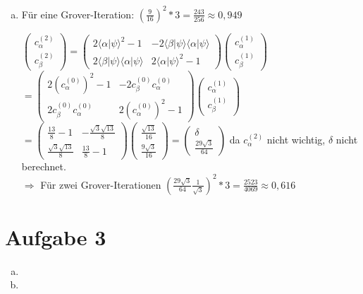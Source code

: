 \documentclass[a4paper]{scrartcl}
\begin{document}
\begin{enumerate}[a)]
\item Für eine Grover-Iteration: $(\frac{9}{16})^2*3 = \frac{243}{256} \approx 0,949$

$\begin{pmatrix} c_{\alpha}^{(2)}\\ c_{\beta}^{(2)}\end{pmatrix} = \begin{pmatrix} 2 \langle \alpha | \psi \rangle^2 -1 & -2 \langle \beta | \psi \rangle \langle \alpha | \psi \rangle \\ 2 \langle \beta | \psi \rangle \langle \alpha | \psi \rangle & 2 \langle \alpha | \psi \rangle^2 -1 \end{pmatrix} \begin{pmatrix} c_{\alpha}^{(1)}\\ c_{\beta}^{(1)}\end{pmatrix}$\\
$=\begin{pmatrix} 2 (c_{\alpha}^{(0)})^2 -1 & -2 c_{\beta}^{(0)} c_{\alpha}^{(0)} \\ 2 c_{\beta}^{(0)} c_{\alpha}^{(0)} & 2 (c_{\alpha}^{(0)})^2 -1 \end{pmatrix} \begin{pmatrix} c_{\alpha}^{(1)}\\ c_{\beta}^{(1)}\end{pmatrix}$\\
$=\begin{pmatrix} \frac{13}{8}-1 & - \frac{\sqrt{3}\sqrt{13}}{8} \\ \frac{\sqrt{3}\sqrt{13}}{8} & \frac{13}{8}-1 \end{pmatrix} \begin{pmatrix}\frac{\sqrt{13}}{16} \\ \frac{9\sqrt{3}}{16}\end{pmatrix} = \begin{pmatrix} \delta \\ \frac{29\sqrt{3}}{64}\end{pmatrix}$ da $c_{\alpha}^{(2)}$ nicht wichtig, $\delta$ nicht berechnet.\\

$\Rightarrow$ Für zwei Grover-Iterationen $(\frac{29\sqrt{3}}{64} \frac{1}{\sqrt{3}})^2*3 = \frac{2523}{4069} \approx 0,616$

\end{enumerate}

\newpage
\section*{Aufgabe 3}
\begin{enumerate}[a)]
\item
\item

\end{enumerate}
\end{document}
